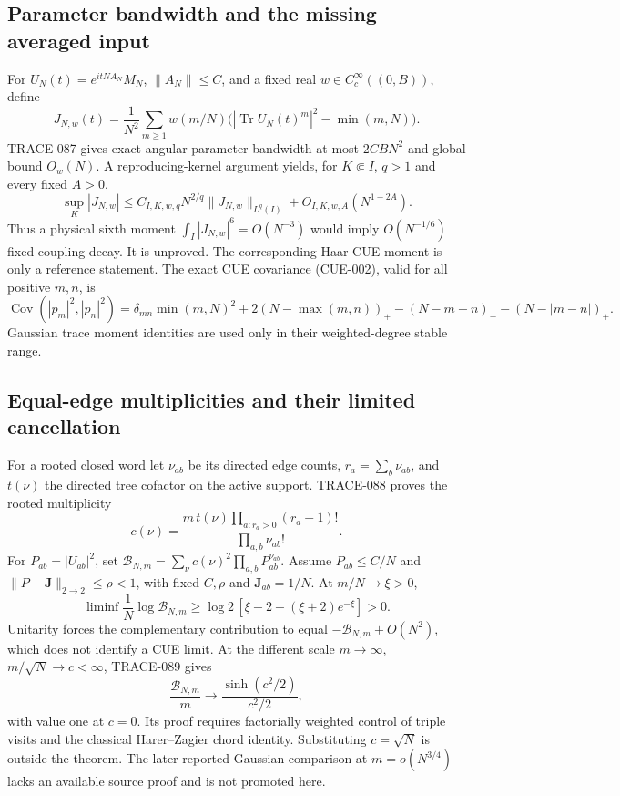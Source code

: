 \subsection{Parameter bandwidth and the missing averaged input}
For $U_N(t)=e^{itNA_N}M_N$, $\|A_N\|\le C$, and a fixed real
$w\in C_c^\infty((0,B))$, define
\[
 J_{N,w}(t)=\frac1{N^2}\sum_{m\ge1}w(m/N)
       \bigl(|\operatorname{Tr}U_N(t)^m|^2-\min(m,N)\bigr).
\]
TRACE-087 gives exact angular parameter bandwidth at most $2CBN^2$ and
global bound $O_w(N)$. A reproducing-kernel argument yields, for
$K\Subset I$, $q>1$ and every fixed $A>0$,
\[
 \sup_K|J_{N,w}|
 \le C_{I,K,w,q}N^{2/q}\|J_{N,w}\|_{L^q(I)}
       +O_{I,K,w,A}(N^{1-2A}).
\]
Thus a physical sixth moment $\int_I|J_{N,w}|^6=O(N^{-3})$ would imply
$O(N^{-1/6})$ fixed-coupling decay. It is unproved. The corresponding
Haar-CUE moment is only a reference statement. The exact CUE covariance
(CUE-002), valid for all positive $m,n$, is
\[
 \operatorname{Cov}(|p_m|^2,|p_n|^2)
 =\delta_{mn}\min(m,N)^2+2(N-\max(m,n))_+
 -(N-m-n)_+-(N-|m-n|)_+.
\]
Gaussian trace moment identities are used only in their weighted-degree
stable range.

\subsection{Equal-edge multiplicities and their limited cancellation}
For a rooted closed word let $\nu_{ab}$ be its directed edge counts,
$r_a=\sum_b\nu_{ab}$, and $t(\nu)$ the directed tree cofactor on the
active support. TRACE-088 proves the rooted multiplicity
\[
 c(\nu)=\frac{m\,t(\nu)\prod_{a:r_a>0}(r_a-1)!}
                   {\prod_{a,b}\nu_{ab}!}.
\]
For $P_{ab}=|U_{ab}|^2$, set
$\mathcal B_{N,m}=\sum_\nu c(\nu)^2\prod_{a,b}P_{ab}^{\nu_{ab}}$.
Assume $P_{ab}\le C/N$ and $\|P-\mathbf J\|_{2\to2}\le\rho<1$,
with fixed $C,\rho$ and $\mathbf J_{ab}=1/N$. At $m/N\to\xi>0$,
\[
 \liminf\frac1N\log\mathcal B_{N,m}
 \ge \log2\,[\xi-2+(\xi+2)e^{-\xi}]>0.
\]
Unitarity forces the complementary contribution to equal
$-\mathcal B_{N,m}+O(N^2)$, which does not identify a CUE limit.
At the different scale $m\to\infty$, $m/\sqrt N\to c<\infty$,
TRACE-089 gives
\[
 \frac{\mathcal B_{N,m}}m\longrightarrow
 \frac{\sinh(c^2/2)}{c^2/2},
\]
with value one at $c=0$. Its proof requires factorially weighted control
of triple visits and the classical Harer--Zagier chord identity. Substituting
$c=\sqrt N$ is outside the theorem. The later reported Gaussian comparison
at $m=o(N^{3/4})$ lacks an available source proof and is not promoted here.

